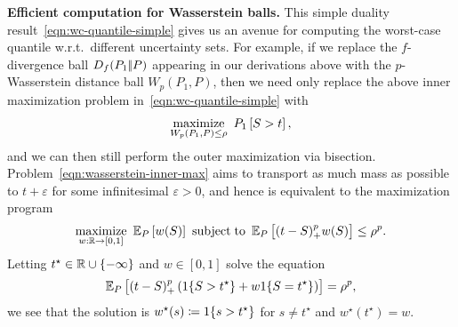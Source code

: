 %

\textbf{Efficient computation for Wasserstein balls.}  This simple duality result~\eqref{eqn:wc-quantile-simple} gives us an avenue for computing the worst-case quantile w.r.t.~different uncertainty sets.  For example, if we replace the $f$-divergence ball $D_{f}({P_1} |\!| {P})$ appearing in our derivations above with the $p$-Wasserstein distance ball $W_p(P_1, P)$, then we need only replace the above inner maximization problem in~\eqref{eqn:wc-quantile-simple} with
\begin{align}
\label{eqn:wasserstein-inner-max}
\mathop{\rm maximize}_{W_p(P_1, P) \le \rho} ~ P_1\left[ S > t \right],
\end{align}
and we can then still perform the outer maximization via bisection. 
Problem~\eqref{eqn:wasserstein-inner-max} aims to transport as much mass as possible to $t+ \varepsilon$ for some infinitesimal $\varepsilon>0$, and hence is equivalent to the maximization program
\begin{align*}
\mathop{\rm maximize}_{w : \mathbb{R} \to [0,1]} ~ \mathbb{E}_P\left[ w(S) \right] ~ \mathop{\rm subject\;to} ~ \mathbb{E}_P \left[ (t - S)_+^p w(S)\right] \le \rho^p.
\end{align*}
Letting $t^\star \in \mathbb{R} \cup \{ - \infty\}$ and $w \in [0,1]$ solve the equation
\begin{align*}
\mathbb{E}_P\left[ (t - S)_+^p \left( 1\!\left\{S > t^\star\right\} + w 1\!\left\{S = t^\star\right\} \right) \right] = \rho^p,
\end{align*}
we see that the solution is $w^\star(s) \coloneqq 1\!\left\{s > t^\star\right\}$ for $s \neq t^\star$ and $w^\star(t^\star) = w$. 

